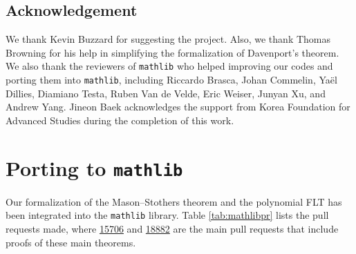 \documentclass[runningheads]{llncs}
\begin{document}
\subsection*{Acknowledgement}
We thank Kevin Buzzard for suggesting the project.
Also, we thank Thomas Browning for his help in simplifying the formalization of  Davenport's theorem.
We also thank the reviewers of \texttt{mathlib} who helped improving our codes and porting them into \texttt{mathlib}, including Riccardo Brasca, Johan Commelin, Yaël Dillies, Diamiano Testa, Ruben Van de Velde, Eric Weiser, Junyan Xu, and Andrew Yang.
Jineon Baek acknowledges the support from Korea Foundation for Advanced Studies during the completion of this work.


\appendix
\section{Porting to \texttt{mathlib}}
\label{sec:porting}


Our formalization of the Mason--Stothers theorem and the polynomial FLT has been integrated into the \texttt{mathlib} library.
Table \ref{tab:mathlibpr} lists the pull requests made, where \href{https://github.com/leanprover-community/mathlib4/pull/15706}{15706} and \href{https://github.com/leanprover-community/mathlib4/pull/18882}{18882} are the main pull requests that include proofs of these main theorems.
\end{document}
